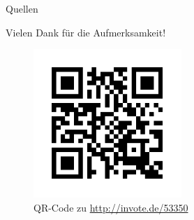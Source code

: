 \documentclass[18pt]{beamer}
\begin{document}
    

    \appendix
    \beginbackup

    \begin{frame}[allowframebreaks]{Quellen}
    
    \end{frame}

    \backupend

    \begin{frame}{Vielen Dank für die Aufmerksamkeit!}
        \begin{figure}[]
            \centering
            \includegraphics[keepaspectratio, width=0.5\textwidth]{figures/qr_pract.png}
            \caption{QR-Code zu \url{http://invote.de/53350}}
        \end{figure}
    \end{frame}
\end{document}
